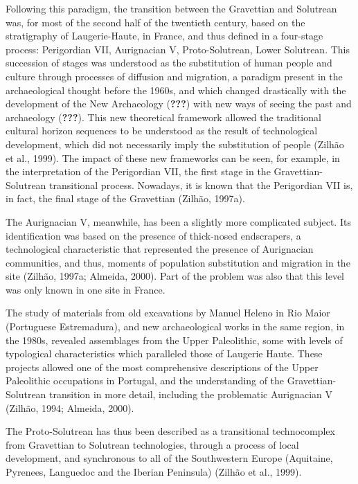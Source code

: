 \documentclass[12pt,twoside]{reedthesis}
\begin{document}
Following this paradigm, the transition between the Gravettian and Solutrean was, for most of the second half of the twentieth century, based on the stratigraphy of Laugerie-Haute, in France, and thus defined in a four-stage process: Perigordian VII, Aurignacian V, Proto-Solutrean, Lower Solutrean. This succession of stages was understood as the substitution of human people and culture through processes of diffusion and migration, a paradigm present in the archaeological thought before the 1960s, and which changed drastically with the development of the New Archaeology ({\textbf{???}}) with new ways of seeing the past and archaeology ({\textbf{???}}). This new theoretical framework allowed the traditional cultural horizon sequences to be understood as the result of technological development, which did not necessarily imply the substitution of people (Zilhão et al., 1999). The impact of these new frameworks can be seen, for example, in the interpretation of the Perigordian VII, the first stage in the Gravettian-Solutrean transitional process. Nowadays, it is known that the Perigordian VII is, in fact, the final stage of the Gravettian (Zilhão, 1997a).

The Aurignacian V, meanwhile, has been a slightly more complicated subject. Its identification was based on the presence of thick-nosed endscrapers, a technological characteristic that represented the presence of Aurignacian communities, and thus, moments of population substitution and migration in the site (Zilhão, 1997a; Almeida, 2000). Part of the problem was also that this level was only known in one site in France.

The study of materials from old excavations by Manuel Heleno in Rio Maior (Portuguese Estremadura), and new archaeological works in the same region, in the 1980s, revealed assemblages from the Upper Paleolithic, some with levels of typological characteristics which paralleled those of Laugerie Haute. These projects allowed one of the most comprehensive descriptions of the Upper Paleolithic occupations in Portugal, and the understanding of the Gravettian-Solutrean transition in more detail, including the problematic Aurignacian V (Zilhão, 1994; Almeida, 2000).

The Proto-Solutrean has thus been described as a transitional technocomplex from Gravettian to Solutrean technologies, through a process of local development, and synchronous to all of the Southwestern Europe (Aquitaine, Pyrenees, Languedoc and the Iberian Peninsula) (Zilhão et al., 1999).
\end{document}
